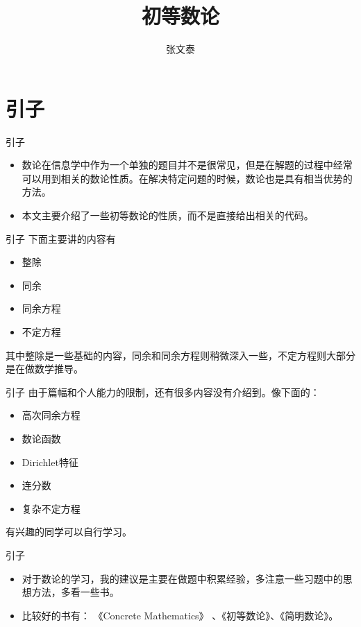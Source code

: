 \documentclass[dvipdfmx]{beamer}
\begin{document}
\title{初等数论}
\author{张文泰}
\date{\version}

\begin{frame}
\titlepage
\end{frame}


\section{引子}

\begin{frame}{引子}
\begin{itemize}
\item 数论在信息学中作为一个单独的题目并不是很常见，但是在解题的过程中经常可以用到相关的数论性质。在解决特定问题的时候，数论也是具有相当优势的方法。
\item 本文主要介绍了一些初等数论的性质，而不是直接给出相关的代码。
\end{itemize}
\end{frame}

\begin{frame}{引子}
下面主要讲的内容有
\begin{itemize}
\item 整除
\item 同余
\item 同余方程
\item 不定方程
\end{itemize}
其中整除是一些基础的内容，同余和同余方程则稍微深入一些，不定方程则大部分是在做数学推导。
\end{frame}

\begin{frame}{引子}
由于篇幅和个人能力的限制，还有很多内容没有介绍到。像下面的：
\begin{itemize}
\item 高次同余方程
\item 数论函数
\item Dirichlet特征
\item 连分数
\item 复杂不定方程
\end{itemize}
有兴趣的同学可以自行学习。
\end{frame}

\begin{frame}{引子}
\begin{itemize}
\item 对于数论的学习，我的建议是主要在做题中积累经验，多注意一些习题中的思想方法，多看一些书。
\item 比较好的书有： 《Concrete Mathematics》 、《初等数论》、《简明数论》。
\end{itemize}
\end{frame}
\end{document}
